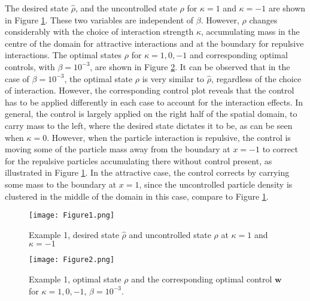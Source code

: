  The desired state $\widehat \rho$, and the uncontrolled state $\rho$ for $\kappa =1$ and $\kappa = -1$ are shown in Figure \ref{Ex12DN1}. These two variables are independent of $\beta$. However, $\rho$ changes considerably with the choice of interaction strength $\kappa$, accumulating mass in the centre of the domain for attractive interactions and at the boundary for repulsive interactions. The optimal states $\rho$ for $\kappa = 1,0,-1$ and corresponding optimal controls, with $\beta = 10^{-3}$, are shown in Figure \ref{Ex12DN2}. 
It can be observed that in the case of $\beta = 10^{-3}$, the optimal state $\rho$ is very similar to $\widehat \rho$, regardless of the choice of interaction. However, the corresponding control plot reveals that the control has to be applied differently in each case to account for the interaction effects. In general, the control is largely applied on the right half of the spatial domain, to carry mass to the left, where the desired state dictates it to be, as can be seen when $\kappa = 0$. However, when the particle interaction is repulsive, the control is moving some of the particle mass away from the boundary at $x=-1$ to correct for the repulsive particles accumulating there without control present, as illustrated in Figure \ref{Ex12DN1}. In the attractive case, the control corrects by carrying some mass to the boundary at $x=1$, since the uncontrolled particle density is clustered in the middle of the domain in this case, compare to Figure \ref{Ex12DN1}.
\begin{figure}[h]
	\texttt{[image: Figure1.png]}
	\caption{Example 1, desired state $\widehat \rho$ and uncontrolled state $\rho$ at $\kappa =1$ and $\kappa =-1$}
	\label{Ex12DN1}
\end{figure}
\begin{figure}[h]
	\texttt{[image: Figure2.png]}
	\caption{Example 1, optimal state $\rho$ and the corresponding optimal control $\mathbf{w}$ for $\kappa = 1,0,-1$, $\beta = 10^{-3}$.}
	\label{Ex12DN2}
\end{figure}



